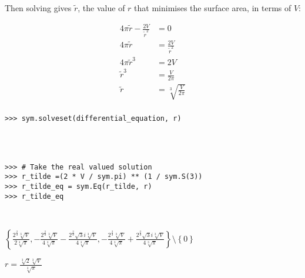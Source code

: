 \documentclass[12pt]{article}
\begin{document}
\begin{mdframed}[linewidth=0.5mm, backgroundcolor=orange!10]
Then solving gives $\tilde{r}$, the value of $r$ that minimises the surface area, in terms of $V$:
\end{mdframed}

\begin{minipage}[t]{.37\textwidth} %
\begin{mdframed}[linewidth=0.5mm, backgroundcolor=cyan!10]
\begin{align*}
4\pi \tilde{r} - \frac{2V}{\tilde{r}^{2}} &= 0 \\
4\pi \tilde{r} &= \frac{2V}{\tilde{r}^{2}} \\
4\pi \tilde{r}^3 &= 2V \\
\tilde{r}^3 &= \frac{V}{2\pi} \\
\tilde{r} &= \sqrt[3]{\frac{V}{2\pi}} \\
\end{align*}
\end{mdframed}
\end{minipage} %
\begin{minipage}[t]{.63\textwidth} %
\begin{verbatim}
>>> sym.solveset(differential_equation, r)




>>> # Take the real valued solution
>>> r_tilde =(2 * V / sym.pi) ** (1 / sym.S(3))
>>> r_tilde_eq = sym.Eq(r_tilde, r)
>>> r_tilde_eq



\end{verbatim}
\vspace{-5.5cm}

\hspace{0.5cm}\begin{minipage}{\textwidth}$\left\{\frac{2^{\frac{2}{3}} \sqrt[3]{V}}{2 \sqrt[3]{\pi}}, - \frac{2^{\frac{2}{3}} \sqrt[3]{V}}{4 \sqrt[3]{\pi}} - \frac{2^{\frac{2}{3}} \sqrt{3} i \sqrt[3]{V}}{4 \sqrt[3]{\pi}}, - \frac{2^{\frac{2}{3}} \sqrt[3]{V}}{4 \sqrt[3]{\pi}} + \frac{2^{\frac{2}{3}} \sqrt{3} i \sqrt[3]{V}}{4 \sqrt[3]{\pi}}\right\} \setminus \left\{0\right\}$\end{minipage}

\vspace{2.7cm}

\hspace{0.5cm}\begin{minipage}{\textwidth}$r = \frac{\sqrt[3]{2} \sqrt[3]{V}}{\sqrt[3]{\pi}}$\end{minipage}
\end{minipage}
\end{document}
